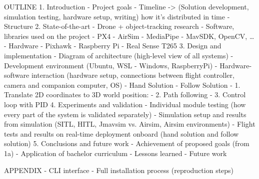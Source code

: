OUTLINE
1. Introduction
 	- Project goals
	- Timeline -> (Solution development, simulation testing, hardware setup, writing) how it's distributed in time
	- Structure
2. State-of-the-art
	- Drone + object-tracking research
	- Software, libraries used on the project
		- PX4
		- AirSim
		- MediaPipe
		- MavSDK, OpenCV, …
	- Hardware
	    - Pixhawk
	    - Raspberry Pi
	    - Real Sense T265
3. Design and implementation
	- Diagram of architecture (high-level view of all systems)
	- Development environment (Ubuntu, WSL - Windows, RaspberryPi)
	- Hardware-software interaction (hardware setup, connections between flight controller, camera and companion computer, OS)
	- Hand Solution
	- Follow Solution
	     - 1. Translate 2D coordinates to 3D world position:
	     - 2. Path following
	     - 3. Control loop with PID
4. Experiments and validation
	- Individual module testing (how every part of the system is validated separately)
	- Simulation setup and results from simulation (SITL, HITL, Jmavsim vs. Airsim, Airsim environments)
	- Flight tests and results on real-time deployment onboard (hand solution and follow solution)
5. Conclusions and future work
	- Achievement of proposed goals (from 1a)
	- Application of bachelor curriculum
	- Lessons learned
	- Future work

APPENDIX
	- CLI interface
	- Full installation process (reproduction steps)